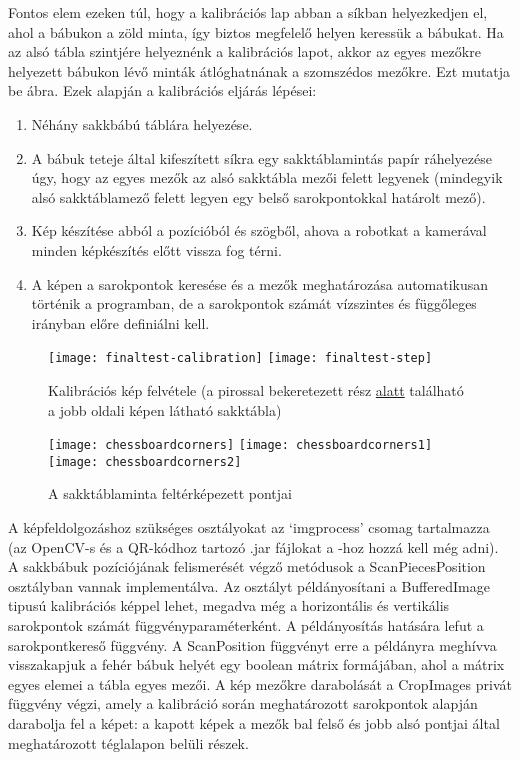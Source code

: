 \documentclass[../documentation.tex]{subfiles}
\begin{document}
Fontos elem ezeken túl, hogy a kalibrációs lap abban a síkban helyezkedjen el, ahol a bábukon a zöld minta, így biztos megfelelő helyen keressük a bábukat. Ha az alsó tábla szintjére helyeznénk a kalibrációs lapot, akkor az egyes mezőkre helyezett bábukon lévő minták átlóghatnának a szomszédos mezőkre. Ezt mutatja be  ábra.
Ezek alapján a kalibrációs eljárás lépései:

\begin{enumerate}
	\item Néhány sakkbábú táblára helyezése.
	\item A bábuk teteje által kifeszített síkra egy sakktáblamintás papír ráhelyezése úgy, hogy az egyes mezők az alsó sakktábla mezői felett legyenek (mindegyik alsó sakktáblamező felett legyen egy belső sarokpontokkal határolt mező).
	\item Kép készítése abból a pozícióból és szögből, ahova a robotkat a kamerával minden képkészítés előtt vissza fog térni.
	\item A képen a sarokpontok keresése és a mezők meghatározása automatikusan történik a programban, de a sarokpontok számát vízszintes és függőleges irányban előre definiálni kell.
\end{enumerate}

\begin{figure}[h]
\centering
\texttt{[image: finaltest-calibration]}
\texttt{[image: finaltest-step]}
\caption{Kalibrációs kép felvétele (a pirossal bekeretezett rész \underline{alatt} található a jobb oldali képen látható sakktábla)}
\label{fig:chessboardcalibration}
\end{figure}

\begin{figure}[h]
\centering
\texttt{[image: chessboardcorners]}
\texttt{[image: chessboardcorners1]}
\texttt{[image: chessboardcorners2]}
\caption{A sakktáblaminta feltérképezett pontjai\protect\footnotemark}
\label{fig:chessboardcorners}
\end{figure}

A képfeldolgozáshoz szükséges osztályokat az `imgprocess' csomag tartalmazza (az OpenCV-s és a QR-kódhoz tartozó .jar fájlokat a -hoz hozzá kell még adni). A sakkbábuk pozíciójának felismerését végző metódusok a ScanPiecesPosition osztályban vannak implementálva. Az osztályt példányosítani a BufferedImage tipusú kalibrációs képpel lehet, megadva még a horizontális és vertikális sarokpontok számát függvényparaméterként. A példányosítás hatására lefut a sarokpontkereső függvény. A ScanPosition függvényt erre a példányra meghívva visszakapjuk a fehér bábuk helyét egy boolean mátrix formájában, ahol a mátrix egyes elemei a tábla egyes mezői. A kép mezőkre darabolását a CropImages privát függvény végzi, amely a kalibráció során meghatározott sarokpontok alapján darabolja fel a képet: a kapott képek a mezők bal felső és jobb alsó pontjai által meghatározott téglalapon belüli részek.
\end{document}
